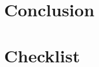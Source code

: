 \documentclass{article}
\begin{document}


\section{Conclusion}\label{sec:conclusion}
\printbibliography
\section*{Checklist}

\end{document}
